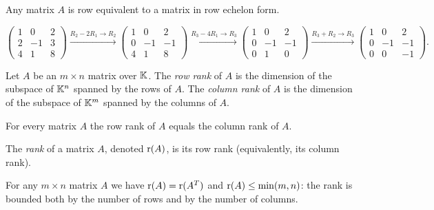 \begin{fact}
Any matrix $A$ is row equivalent to a matrix in row echelon form.
\end{fact}

\begin{example}
\[
\left( \begin{array}{ccc}
1 & 0 & 2\\ 2 & -1 & 3\\ 4 & 1 & 8
\end{array} \right)
\xrightarrow{R_2-2R_1\to R_2}
\left( \begin{array}{ccc}
1 & 0 & 2\\ 0 & -1 & -1\\ 4 & 1 & 8
\end{array} \right)
\xrightarrow{R_3-4R_1\to R_3}
\left( \begin{array}{ccc}
1 & 0 & 2\\ 0 & -1 & -1\\ 0 & 1 & 0
\end{array} \right)
\xrightarrow{R_3+R_2\to R_3}
\left( \begin{array}{ccc}
1 & 0 & 2\\ 0 & -1 & -1\\ 0 & 0 & -1
\end{array} \right).
\]
\end{example}

\begin{definition}
Let $A$ be an $m\times n$ matrix over $\mathbb{K}$. The \emph{row rank} of $A$ is the dimension of the subspace of
$\mathbb{K}^n$ spanned by the rows of $A$. The \emph{column rank} of $A$ is the dimension of the subspace of $\mathbb{K}^m$
spanned by the columns of $A$.
\end{definition}

\begin{theorem}
For every matrix $A$ the row rank of $A$ equals the column rank of $A$.
\end{theorem}

\begin{definition}
The \emph{rank} of a matrix $A$, denoted $\operatorname{r}(A)$, is its row rank (equivalently, its column rank).
\end{definition}

\begin{fact}
For any $m\times n$ matrix $A$ we have $\operatorname{r}(A) = \operatorname{r}(A^T)$ and $\operatorname{r}(A)\leq \min(m,n)$: the rank is
bounded both by the number of rows and by the number of columns.
\end{fact}

